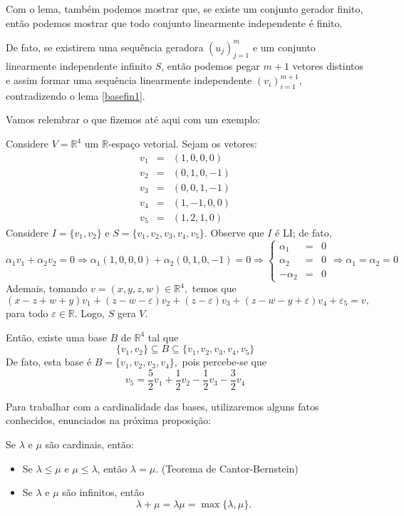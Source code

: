 \documentclass[11pt,twoside,a4paper]{book}
\begin{document}
\begin{observacao}\label{basefin2}
Com o lema, também podemos mostrar que, se existe um conjunto gerador finito, então podemos mostrar que todo conjunto linearmente independente é finito.

\medskip
\noindent
De fato, se existirem uma sequência geradora $(u_j)_{j=1}^m$ e um conjunto linearmente independente infinito $S$, então podemos pegar $m+1$ vetores distintos e assim formar uma sequência linearmente independente $(v_i)_{i=1}^{m+1}$, contradizendo o lema \ref{basefin1}.
\end{observacao}

\noindent
Vamos relembrar o que fizemos até aqui com um exemplo:
\begin{exemplo}
Considere $V = \mathbb{R}^4$ um $\mathbb{R}$-espaço vetorial. Sejam os vetores:
\[
\begin{array}{rcl}
v_1 &=& (1,0,0,0) \\
v_2 &=& (0,1,0,-1) \\
v_3 &=& (0,0,1,-1) \\
v_4 &=& (1,-1,0,0) \\
v_5 &=& (1,2,1,0) 
\end{array}
\]
Considere $I = \{ v_1, v_2 \}$ e $S  =\{ v_1,v_2,v_3,v_4,v_5 \}.$ Observe que $I$ é LI; de fato,
\[
\alpha_1v_1 + \alpha_2v_2 = 0 \Rightarrow \alpha_1(1,0,0,0) + \alpha_2 (0,1,0,-1) = 0 \Rightarrow \left\{ \begin{array}{rcl} \alpha_1 &=& 0 \\ \alpha_2 &=& 0 \\ - \alpha_2 &=& 0 \end{array} \right. \Rightarrow \alpha_1 = \alpha_2 = 0
\]
Ademais, tomando $v = (x,y,z,w) \in \mathbb{R}^4,$ temos que
\[
(x-z+w+y)v_1 + (z- w - \varepsilon)v_2 + (z - \varepsilon)v_3 + (z-w-y + \varepsilon)v_4 + \varepsilon_5 = v,
\]
para todo $\varepsilon \in \mathbb{R}.$ Logo, $S$ gera $V.$ 

\medskip
\noindent
Então, existe uma base $B$ de $\mathbb{R}^4$ tal que 
\[
\{ v_1, v_2 \} \subseteq B \subseteq \{v_1,v_2,v_3,v_4,v_5 \}
\]
De fato, esta base é $B=\{v_1, v_2, v_3, v_4 \},$ pois percebe-se que
\[
v_5 = \frac{5}{2}v_1 + \frac{1}{2} v_2 - \frac{1}{2}v_3 - \frac{3}{2} v_4
\]
\end{exemplo}

\noindent
Para trabalhar com a cardinalidade das bases, utilizaremos alguns fatos
conhecidos, enunciados na próxima proposição:
\begin{proposicao}
Se $\lambda$ e $\mu$ são cardinais, então:
\begin{itemize}
\item Se $\lambda\leq\mu$ e $\mu\leq\lambda$, então $\lambda=\mu$. (Teorema de Cantor-Bernstein)
\item Se $\lambda$ e $\mu$ são infinitos, então \[\lambda+\mu=\lambda\mu=\max\{\lambda,\mu\}.\]
\end{itemize}
\end{proposicao}
\end{document}
